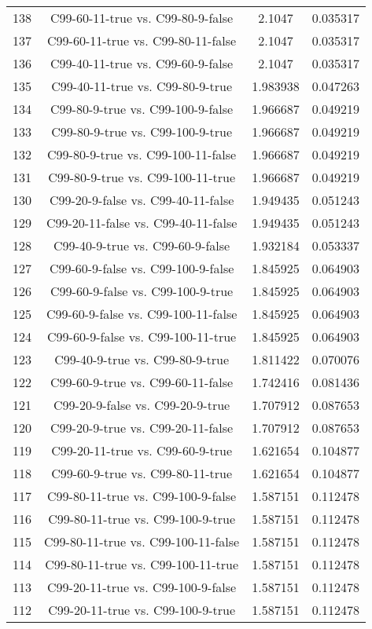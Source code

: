 \documentclass[a4paper,10pt]{article}
\begin{document}
\begin{landscape}
\begin{table}[!htp]
\begin{tabular}{cccc}
138&C99-60-11-true vs. C99-80-9-false&2.1047&0.035317\\
137&C99-60-11-true vs. C99-80-11-false&2.1047&0.035317\\
136&C99-40-11-true vs. C99-60-9-false&2.1047&0.035317\\
135&C99-40-11-true vs. C99-80-9-true&1.983938&0.047263\\
134&C99-80-9-true vs. C99-100-9-false&1.966687&0.049219\\
133&C99-80-9-true vs. C99-100-9-true&1.966687&0.049219\\
132&C99-80-9-true vs. C99-100-11-false&1.966687&0.049219\\
131&C99-80-9-true vs. C99-100-11-true&1.966687&0.049219\\
130&C99-20-9-false vs. C99-40-11-false&1.949435&0.051243\\
129&C99-20-11-false vs. C99-40-11-false&1.949435&0.051243\\
128&C99-40-9-true vs. C99-60-9-false&1.932184&0.053337\\
127&C99-60-9-false vs. C99-100-9-false&1.845925&0.064903\\
126&C99-60-9-false vs. C99-100-9-true&1.845925&0.064903\\
125&C99-60-9-false vs. C99-100-11-false&1.845925&0.064903\\
124&C99-60-9-false vs. C99-100-11-true&1.845925&0.064903\\
123&C99-40-9-true vs. C99-80-9-true&1.811422&0.070076\\
122&C99-60-9-true vs. C99-60-11-false&1.742416&0.081436\\
121&C99-20-9-false vs. C99-20-9-true&1.707912&0.087653\\
120&C99-20-9-true vs. C99-20-11-false&1.707912&0.087653\\
119&C99-20-11-true vs. C99-60-9-true&1.621654&0.104877\\
118&C99-60-9-true vs. C99-80-11-true&1.621654&0.104877\\
117&C99-80-11-true vs. C99-100-9-false&1.587151&0.112478\\
116&C99-80-11-true vs. C99-100-9-true&1.587151&0.112478\\
115&C99-80-11-true vs. C99-100-11-false&1.587151&0.112478\\
114&C99-80-11-true vs. C99-100-11-true&1.587151&0.112478\\
113&C99-20-11-true vs. C99-100-9-false&1.587151&0.112478\\
112&C99-20-11-true vs. C99-100-9-true&1.587151&0.112478\\

\end{tabular}
\end{table}
\end{landscape}
\end{document}
